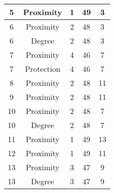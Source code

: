 \documentclass[results.tex]{subfiles}
\begin{document}
\begin{center}
\begin{tabular}{| c || c | c | c | c |}
            \hline
            5                       & Proximity                    & 1                      & 49                      & 3                    \\
            \hline
            6                       & Proximity                    & 2                      & 48                      & 3                    \\
            \hline
            6                       & Degree                       & 2                      & 48                      & 3                    \\
            \hline
            7                       & Proximity                    & 4                      & 46                      & 7                    \\
            \hline
            7                       & Protection                   & 4                      & 46                      & 7                    \\
            \hline
            8                       & Proximity                    & 2                      & 48                      & 11                   \\
            \hline
            9                       & Proximity                    & 2                      & 48                      & 11                   \\
            \hline
            10                      & Proximity                    & 2                      & 48                      & 7                    \\
            \hline
            10                      & Degree                       & 2                      & 48                      & 7                    \\
            \hline
            11                      & Proximity                    & 1                      & 49                      & 13                   \\
            \hline
            12                      & Proximity                    & 1                      & 49                      & 11                   \\
            \hline
            13                      & Proximity                    & 3                      & 47                      & 9                    \\
            \hline
            13                      & Degree                       & 3                      & 47                      & 9                    \\

\end{tabular}
\end{center}
\end{document}
